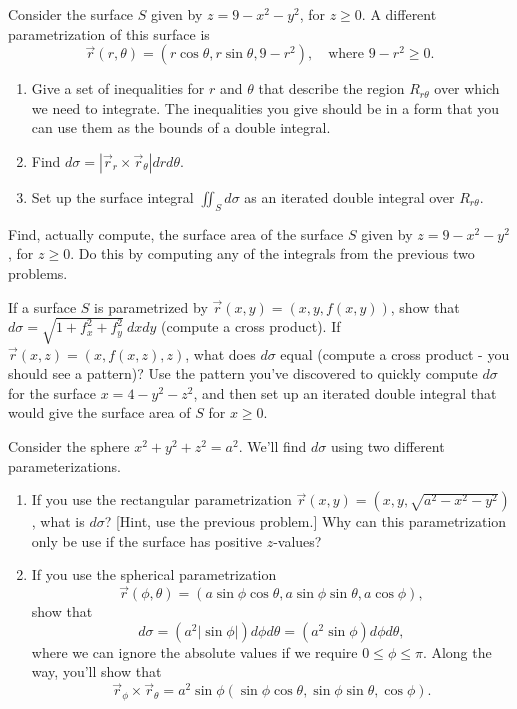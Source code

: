 \begin{problem}
 Consider the surface $S$ given by $z=9-x^2-y^2$, for $z\geq 0$. A different parametrization of this surface is $$\vec r(r,\theta) = (r\cos\theta,r\sin\theta,9-r^2),\quad \text{where } 9-r^2\geq 0.$$ 
\begin{enumerate}
 \item Give a set of inequalities for $r$ and $\theta$ that describe the region $R_{r\theta}$ over which we need to integrate. The inequalities you give should be in a form that you can use them as the bounds of a double integral.
 \item Find $d\sigma = \left|\vec r_r\times \vec r_\theta \right|drd\theta$.
 \item Set up the surface integral $\iint_S d\sigma$ as an iterated double integral over $R_{r\theta}$. 
\end{enumerate}
\end{problem}

\begin{problem}
 Find, actually compute, the surface area of the surface $S$ given by $z=9-x^2-y^2$, for $z\geq 0$. Do this by computing any of the integrals from the previous two problems.
\end{problem}

\begin{problem}
 If a surface $S$ is parametrized by $\vec r(x,y) = (x,y,f(x,y))$, show that $d\sigma = \sqrt{1+f_x^2+f_y^2}\ dxdy$ (compute a cross product).  
If $\vec r(x,z) = (x,f(x,z),z)$, what does $d\sigma$ equal (compute a cross product - you should see a pattern)?
Use the pattern you've discovered to quickly compute $d\sigma$ for the surface $x=4-y^2-z^2$, and then set up an iterated double integral that would give the surface area of $S$ for $x\geq 0$. 
\end{problem}


\begin{problem}\label{sphere surface area element}
 Consider the sphere $x^2+y^2+z^2=a^2$.  We'll find $d\sigma$ using two different parameterizations.
 \begin{enumerate}
  \item If you use the rectangular parametrization $\vec r(x,y) = (x,y,\sqrt{a^2-x^2-y^2})$, what is $d\sigma$? [Hint, use the previous problem.] Why can this parametrization only be use if the surface has positive $z$-values?
  \item {} If you use the spherical parametrization $$\vec r(\phi,\theta) = (a\sin\phi\cos\theta,a\sin\phi\sin\theta,a\cos\phi),$$ show that $$d\sigma = (a^2|\sin\phi|)d\phi d\theta= (a^2\sin\phi) d\phi d\theta,$$ where we can ignore the absolute values if we require $0\leq \phi\leq \pi$. Along the way, you'll show that 
$$ \vec r_\phi\times \vec r_\theta = a^2\sin \phi (\sin\phi\cos\theta,\sin\phi\sin\theta,\cos\phi).$$
 \end{enumerate}
\end{problem}

